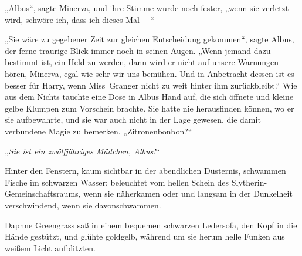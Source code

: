 „Albus“, sagte Minerva, und ihre Stimme wurde noch fester, „wenn sie verletzt wird, schwöre ich, dass ich dieses Mal —“

„Sie wäre zu gegebener Zeit zur gleichen Entscheidung gekommen“, sagte Albus, der ferne traurige Blick immer noch in seinen Augen.
„Wenn jemand dazu bestimmt ist, ein Held zu werden, dann wird er nicht auf unsere Warnungen hören, Minerva, egal wie sehr wir uns bemühen. Und in Anbetracht dessen ist es besser für Harry, wenn Miss~Granger nicht zu weit hinter ihm zurückbleibt.“ Wie aus dem Nichts tauchte eine Dose in Albus Hand auf, die sich öffnete und kleine gelbe Klumpen zum Vorschein brachte. Sie hatte nie herausfinden können, wo er sie aufbewahrte, und sie war auch nicht in der Lage gewesen, die damit verbundene Magie zu bemerken.
„Zitronenbonbon?“

„\emph{Sie ist ein zwölfjähriges Mädchen, Albus!}“


Hinter den Fenstern, kaum sichtbar in der abendlichen Düsternis, schwammen Fische im schwarzen Wasser; beleuchtet vom hellen Schein des Slytherin-Gemeinschaftsraums, wenn sie näherkamen oder und langsam in der Dunkelheit verschwindend, wenn sie davonschwammen.

Daphne Greengrass saß in einem bequemen schwarzen Ledersofa, den Kopf in die Hände gestützt, und glühte goldgelb, während um sie herum helle Funken aus weißem Licht aufblitzten.

